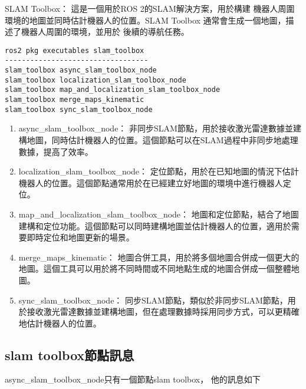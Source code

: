 SLAM Toolbox： 這是一個用於ROS 2的SLAM解決方案，用於構建
機器人周圍環境的地圖並同時估計機器人的位置。SLAM Toolbox
通常會生成一個地圖，描述了機器人周圍的環境，並用於
後續的導航任務。


\begin{tcolorbox}
\begin{verbatim}
ros2 pkg executables slam_toolbox
----------------------------------
slam_toolbox async_slam_toolbox_node
slam_toolbox localization_slam_toolbox_node
slam_toolbox map_and_localization_slam_toolbox_node
slam_toolbox merge_maps_kinematic
slam_toolbox sync_slam_toolbox_node
\end{verbatim}
\end{tcolorbox}
\begin{enumerate}
    \item async\_slam\_toolbox\_node： 非同步SLAM節點，用於接收激光雷達數據並建構地圖，同時估計機器人的位置。這個節點可以在SLAM過程中非同步地處理數據，提高了效率。
    \item localization\_slam\_toolbox\_node： 定位節點，用於在已知地圖的情況下估計機器人的位置。這個節點通常用於在已經建立好地圖的環境中進行機器人定位。
    \item map\_and\_localization\_slam\_toolbox\_node： 地圖和定位節點，結合了地圖建構和定位功能。這個節點可以同時建構地圖並估計機器人的位置，適用於需要即時定位和地圖更新的場景。
    \item merge\_maps\_kinematic： 地圖合併工具，用於將多個地圖合併成一個更大的地圖。這個工具可以用於將不同時間或不同地點生成的地圖合併成一個整體地圖。
    \item sync\_slam\_toolbox\_node： 同步SLAM節點，類似於非同步SLAM節點，用於接收激光雷達數據並建構地圖，但在處理數據時採用同步方式，可以更精確地估計機器人的位置。
\end{enumerate}
\subsection{slam toolbox節點訊息}
async\_slam\_toolbox\_node只有一個節點slam toolbox，
他的訊息如下

